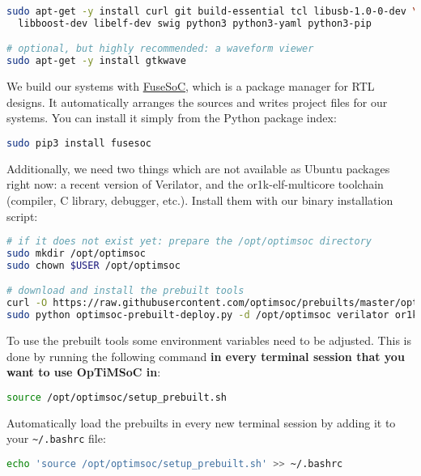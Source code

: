 \begin{lstlisting}[language=sh]
sudo apt-get -y install curl git build-essential tcl libusb-1.0-0-dev \
  libboost-dev libelf-dev swig python3 python3-yaml python3-pip

# optional, but highly recommended: a waveform viewer
sudo apt-get -y install gtkwave
\end{lstlisting}

We build our systems with
\href{https://github.com/olofk/fusesoc}{FuseSoC}, which is a package
manager for RTL designs. It automatically arranges the sources and
writes project files for our systems. You can install it simply from
the Python package index:

\begin{lstlisting}[language=sh]
sudo pip3 install fusesoc
\end{lstlisting}

Additionally, we need two things which are not available as Ubuntu packages right now: a recent version of Verilator, and the or1k-elf-multicore toolchain (compiler, C library, debugger, etc.).
Install them with our binary installation script:

\begin{lstlisting}[language=sh]
# if it does not exist yet: prepare the /opt/optimsoc directory
sudo mkdir /opt/optimsoc
sudo chown $USER /opt/optimsoc

# download and install the prebuilt tools
curl -O https://raw.githubusercontent.com/optimsoc/prebuilts/master/optimsoc-prebuilt-deploy.py
sudo python optimsoc-prebuilt-deploy.py -d /opt/optimsoc verilator or1kelf
\end{lstlisting}

To use the prebuilt tools some environment variables need to be adjusted.
This is done by running the following command \textbf{in every terminal session that you want to use OpTiMSoC in}:

\begin{lstlisting}[language=sh]
source /opt/optimsoc/setup_prebuilt.sh
\end{lstlisting}

\begin{docnote}
Automatically load the prebuilts in every new terminal session by adding it to your \verb|~/.bashrc| file:

\begin{lstlisting}[language=sh]
echo 'source /opt/optimsoc/setup_prebuilt.sh' >> ~/.bashrc
\end{lstlisting}
\end{docnote}


